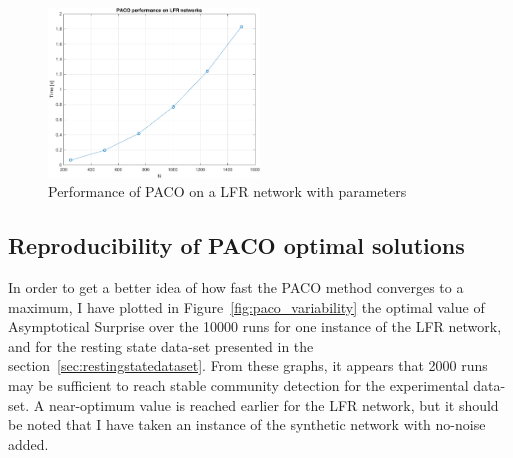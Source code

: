 \begin{figure}[htb!]
\centering
\includegraphics[width=0.5\textwidth]{images/paco_benchmark.pdf}
\caption{Performance of PACO on a LFR network with parameters}
\label{fig:paco_benchmark}
\end{figure}

\subsection{Reproducibility of PACO optimal solutions}
In order to get a better idea of how fast the PACO method converges to a maximum, I have plotted in Figure~\ref{fig:paco_variability} the optimal value of Asymptotical Surprise over the 10000 runs for one instance of the LFR network, and for the resting state data-set presented in the section~\ref{sec:restingstatedataset}.
From these graphs, it appears that 2000 runs may be sufficient to reach stable community detection for the experimental data-set.
A near-optimum value is reached earlier for the LFR network, but it should be noted that I have taken an instance of the synthetic network with no-noise added.

